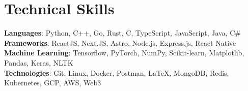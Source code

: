 
    \resumeSubHeadingListEnd
\vspace{-15pt}

%
\section{Technical Skills}
 \begin{itemize}[leftmargin=0.15in,label={}]
    \small{\item{
     \textbf{Languages}{: Python, C++, Go, Rust, C, TypeScript, JavaScript, Java, C\#} \\
     \textbf{Frameworks}{: ReactJS, Next.JS, Astro, Node.js, Express.js, React Native} \\
     \textbf{Machine Learning}{: Tensorflow, PyTorch, NumPy, Scikit-learn, Matplotlib, Pandas, Keras, NLTK} \\
     \textbf{Technologies}{: Git, Linux, Docker, Postman, \LaTeX, MongoDB, Redis, Kubernetes, GCP, AWS, Web3} \\
    }}
 \end{itemize}
 \vspace{-16pt}
